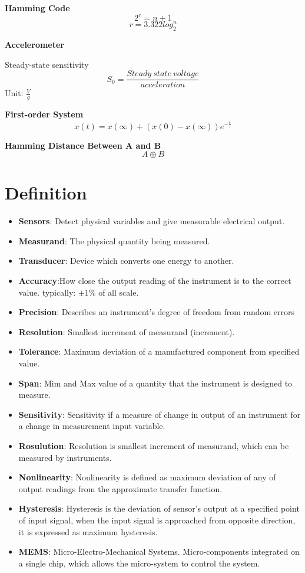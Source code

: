 \documentclass{article}
\begin{document}
	
	\textbf{Hamming Code}
	$$2^r = n+1$$
	$$ r = 3.322log_2^n$$
	
	\textbf{Accelerometer}
	
	Steady-state sensitivity
	$$ S_0 = \frac{Steady\ state \ voltage}{acceleration} $$ 
	Unit: $\frac{V}{g}$
	
	\textbf{First-order System}
	$$x(t) = x(\infty) + (x(0) - x(\infty))e^{-\frac{t}{\tau}}$$
	
	\textbf{Hamming Distance Between A and B}
	$$A \oplus B$$
	
	
	
	\section{Definition}
	\begin{itemize}
		
		\item \textbf{Sensors}: Detect physical variables and give measurable electrical output.
		\item \textbf{Measurand}: The physical quantity being measured.
		\item \textbf{Transducer}: Device which converts one energy to another.
		\item \textbf{Accuracy}:How close the output reading of the instrument is to the correct value.
		typically: $\pm 1\%$ of all scale.
		\item \textbf{Precision}: Describes an instrument’s degree of freedom from random errors
		\item \textbf{Resolution}: Smallest increment of measurand (increment).
		\item \textbf{Tolerance}: Maximum deviation of a manufactured component from specified value.
		\item \textbf{Span}: Mim and Max value of a quantity that the instrument is designed to measure.
		\item \textbf{Sensitivity}: Sensitivity if a measure of change in output of an instrument for a change in measurement input variable.
		\item \textbf{Rosulution}: Resolution is smallest increment of measurand, which can be measured by instruments.
		
		\item \textbf{Nonlinearity}: Nonlinearity is defined as maximum deviation of any of output readings from the approximate transfer function.
		
		\item \textbf{Hysteresis}: Hysteresis is the deviation of sensor's output at a specified point of input signal, when the input signal is approached from opposite direction, it is expressed as maximum hysteresis.
		
		\item \textbf{MEMS}: Micro-Electro-Mechanical Systems. Micro-components integrated on a single chip, which allows the micro-system to control the system.

	\end{itemize}
	
\end{document}
